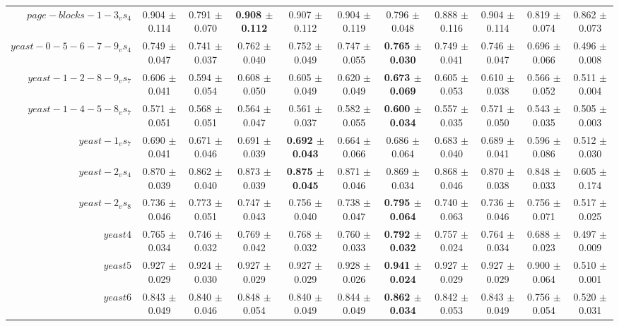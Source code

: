 \begin{table}[!ht]
{\begin{tabular}{r c c c c c c c c c c}
$page-blocks-1-3_vs_4$ & 0.904 $\pm$ 0.114 & 0.791 $\pm$ 0.070 & \textbf{0.908 $\pm$ 0.112} & 0.907 $\pm$ 0.112 & 0.904 $\pm$ 0.119 & 0.796 $\pm$ 0.048 & 0.888 $\pm$ 0.116 & 0.904 $\pm$ 0.114 & 0.819 $\pm$ 0.074 & 0.862 $\pm$ 0.073 \\
$yeast-0-5-6-7-9_vs_4$ & 0.749 $\pm$ 0.047 & 0.741 $\pm$ 0.037 & 0.762 $\pm$ 0.040 & 0.752 $\pm$ 0.049 & 0.747 $\pm$ 0.055 & \textbf{0.765 $\pm$ 0.030} & 0.749 $\pm$ 0.041 & 0.746 $\pm$ 0.047 & 0.696 $\pm$ 0.066 & 0.496 $\pm$ 0.008 \\
$yeast-1-2-8-9_vs_7$ & 0.606 $\pm$ 0.041 & 0.594 $\pm$ 0.054 & 0.608 $\pm$ 0.050 & 0.605 $\pm$ 0.049 & 0.620 $\pm$ 0.049 & \textbf{0.673 $\pm$ 0.069} & 0.605 $\pm$ 0.053 & 0.610 $\pm$ 0.038 & 0.566 $\pm$ 0.052 & 0.511 $\pm$ 0.004 \\
$yeast-1-4-5-8_vs_7$ & 0.571 $\pm$ 0.051 & 0.568 $\pm$ 0.051 & 0.564 $\pm$ 0.047 & 0.561 $\pm$ 0.037 & 0.582 $\pm$ 0.055 & \textbf{0.600 $\pm$ 0.034} & 0.557 $\pm$ 0.035 & 0.571 $\pm$ 0.050 & 0.543 $\pm$ 0.035 & 0.505 $\pm$ 0.003 \\
$yeast-1_vs_7$ & 0.690 $\pm$ 0.041 & 0.671 $\pm$ 0.046 & 0.691 $\pm$ 0.039 & \textbf{0.692 $\pm$ 0.043} & 0.664 $\pm$ 0.066 & 0.686 $\pm$ 0.064 & 0.683 $\pm$ 0.040 & 0.689 $\pm$ 0.041 & 0.596 $\pm$ 0.086 & 0.512 $\pm$ 0.030 \\
$yeast-2_vs_4$ & 0.870 $\pm$ 0.039 & 0.862 $\pm$ 0.040 & 0.873 $\pm$ 0.039 & \textbf{0.875 $\pm$ 0.045} & 0.871 $\pm$ 0.046 & 0.869 $\pm$ 0.034 & 0.868 $\pm$ 0.046 & 0.870 $\pm$ 0.038 & 0.848 $\pm$ 0.033 & 0.605 $\pm$ 0.174 \\
$yeast-2_vs_8$ & 0.736 $\pm$ 0.046 & 0.773 $\pm$ 0.051 & 0.747 $\pm$ 0.043 & 0.756 $\pm$ 0.040 & 0.738 $\pm$ 0.047 & \textbf{0.795 $\pm$ 0.064} & 0.740 $\pm$ 0.063 & 0.736 $\pm$ 0.046 & 0.756 $\pm$ 0.071 & 0.517 $\pm$ 0.025 \\
$yeast4$ & 0.765 $\pm$ 0.034 & 0.746 $\pm$ 0.032 & 0.769 $\pm$ 0.042 & 0.768 $\pm$ 0.032 & 0.760 $\pm$ 0.033 & \textbf{0.792 $\pm$ 0.032} & 0.757 $\pm$ 0.024 & 0.764 $\pm$ 0.034 & 0.688 $\pm$ 0.023 & 0.497 $\pm$ 0.009 \\
$yeast5$ & 0.927 $\pm$ 0.029 & 0.924 $\pm$ 0.030 & 0.927 $\pm$ 0.029 & 0.927 $\pm$ 0.029 & 0.928 $\pm$ 0.026 & \textbf{0.941 $\pm$ 0.024} & 0.927 $\pm$ 0.029 & 0.927 $\pm$ 0.029 & 0.900 $\pm$ 0.064 & 0.510 $\pm$ 0.001 \\
$yeast6$ & 0.843 $\pm$ 0.049 & 0.840 $\pm$ 0.046 & 0.848 $\pm$ 0.054 & 0.840 $\pm$ 0.049 & 0.844 $\pm$ 0.049 & \textbf{0.862 $\pm$ 0.034} & 0.842 $\pm$ 0.053 & 0.843 $\pm$ 0.049 & 0.756 $\pm$ 0.054 & 0.520 $\pm$ 0.031 \\

\end{tabular}}
\end{table}
